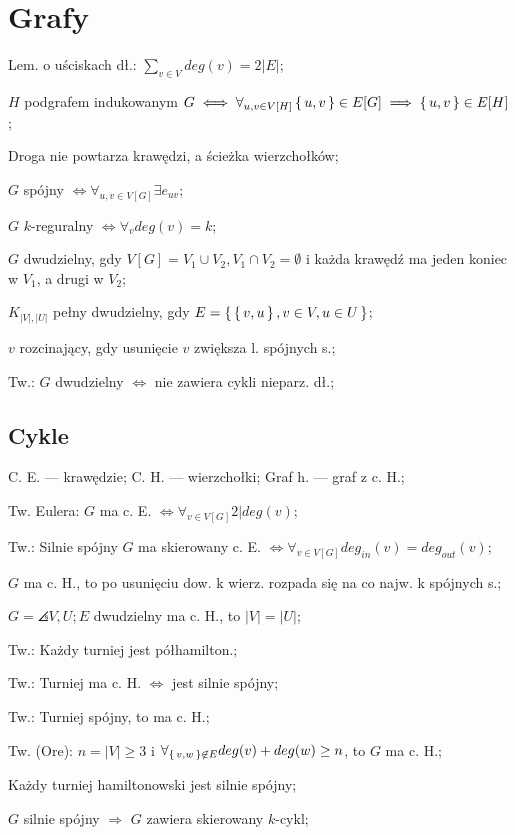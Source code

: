 \section{Grafy}

Lem. o uściskach dł.: $\sum_{v\in V} deg(v) = 2|E|$;

$H$ podgrafem indukowanym $G
  \iff \forall_{u,v \in V[H]} \set{u, v} \in E[G] \implies \set{u, v}\in E[H]$;

Droga nie powtarza krawędzi, a ścieżka wierzchołków;

$G$ spójny $\iff \forall_{u,v\in V[G]} \exists e_{uv}$;

$G$ $k$-reguralny $\iff \forall_v deg(v) = k$;

$G$ dwudzielny, gdy $V[G] = V_1 \cup V_2, V_1 \cap V_2 = \emptyset$ i każda
  krawędź ma jeden koniec w $V_1$, a drugi w $V_2$;

$K_{|V|, |U|}$ pełny dwudzielny, gdy $E=\set{\set{v, u}, v \in V, u \in U}$;

$v$ rozcinający, gdy usunięcie $v$ zwiększa l. spójnych s.;

Tw.: $G$ dwudzielny $\iff$ nie zawiera cykli nieparz. dł.;

\subsection{Cykle}

C. E. --- krawędzie; C. H. --- wierzchołki; Graf h. --- graf z c. H.;

Tw. Eulera: $G$ ma c. E. $\iff \forall_{v \in V[G]} 2|deg(v)$;

Tw.: Silnie spójny $G$ ma skierowany c. E.
  $\iff \forall_{v \in V[G]} deg_{in}(v) = deg_{out}(v)$;

$G$ ma c. H., to po usunięciu dow. k wierz. rozpada się na co najw.
  k spójnych s.;

$G = \angles{V, U; E}$ dwudzielny ma c. H., to $|V|=|U|$;

Tw.: Każdy turniej jest półhamilton.;

Tw.: Turniej ma c. H. $\iff$ jest silnie spójny;

Tw.: Turniej spójny, to ma c. H.;

Tw. (Ore): $n=|V|\geq 3$ i
  $\forall_{\set{v, w} \not\in E} deg(v) + deg(w) \geq n$, to $G$ ma c. H.;

Każdy turniej hamiltonowski jest silnie spójny;

$G$ silnie spójny $\Rightarrow$ $G$ zawiera skierowany $k\text{-cykl}$;

